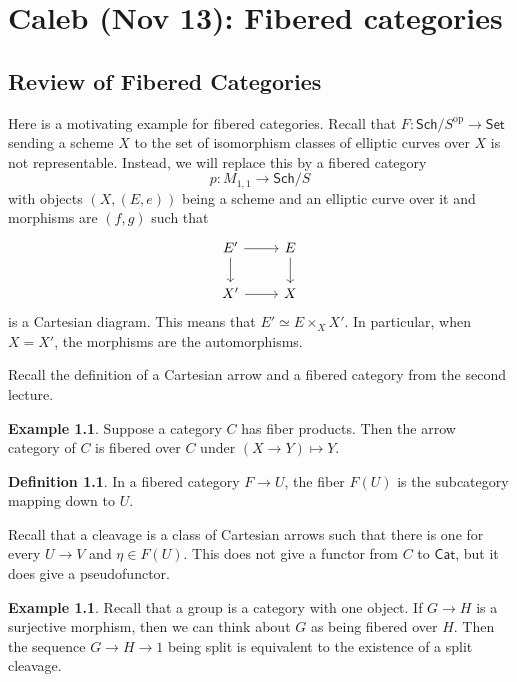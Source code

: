 \documentclass[leqno, openany]{memoir}
\theoremstyle{definition}
\newtheorem{defn}[thm]{Definition}
\newtheorem{exm}[thm]{Example}
\theoremstyle{remark}
\theoremstyle{plain}
\theoremstyle{definition}
\theoremstyle{remark}
\newcommand{\mr}[1]{\mathrm{#1}}
\newcommand{\ms}[1]{\mathsf{#1}}
\begin{document}
\chapter{Caleb (Nov 13): Fibered categories}%
\label{cha:caleb_nov_13_toproll_and_fibered_categories}

\section{Review of Fibered Categories}%
\label{sec:more_on_fibered_categories}

Here is a motivating example for fibered categories. Recall that $F \colon \ms{Sch}/S^{\mr{op}} \to \ms{Set}$ sending a scheme $X$ to the set of isomorphism classes of elliptic curves over $X$ is not representable. Instead, we will replace this by a fibered category
\[ p \colon M_{1,1} \to \ms{Sch}/S \]
with objects $(X, (E,e))$ being a scheme and an elliptic curve over it and morphisms are $(f,g)$ such that
\begin{equation*}
\begin{tikzcd}
    E' \arrow{r} \arrow{d} & E \arrow{d} \\
    X' \arrow{r} & X
\end{tikzcd}
\end{equation*}
is a Cartesian diagram. This means that $E' \simeq E \times_X X'$. In particular, when $X = X'$, the morphisms are the automorphisms.

Recall the definition of a Cartesian arrow and a fibered category from the second lecture. 

\begin{exm}
    Suppose a category $C$ has fiber products. Then the arrow category of $C$ is fibered over $C$ under $(X \to Y) \mapsto Y$.
\end{exm}

\begin{defn}
    In a fibered category $F \to U$, the fiber $F(U)$ is the subcategory mapping down to $U$.
\end{defn}

Recall that a cleavage is a class of Cartesian arrows such that there is one for every $U \to V$ and $\eta \in F(U)$. This does not give a functor from $C$ to $\ms{Cat}$, but it does give a pseudofunctor. 

\begin{exm}
    Recall that a group is a category with one object. If $G \to H$ is a surjective morphism, then we can think about $G$ as being fibered over $H$. Then the sequence $G \to H \to 1$ being split is equivalent to the existence of a split cleavage.
\end{exm}
\end{document}

